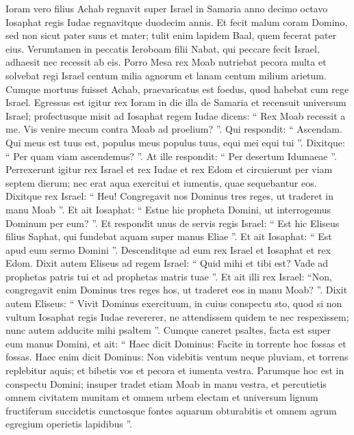 \begin{biblechapter}
\begin{biblechapter}
\begin{biblechapter}
 \verse Ioram vero filius Achab regnavit super Israel in Samaria anno decimo octavo Iosaphat regis Iudae regnavitque duodecim annis. 
\verse Et fecit malum coram Domino, sed non sicut pater suus et mater; tulit enim lapidem Baal, quem fecerat pater eius. 
\verse Verumtamen in peccatis Ieroboam filii Nabat, qui peccare fecit Israel, adhaesit nec recessit ab eis.
 \verse Porro Mesa rex Moab nutriebat pecora multa et solvebat regi Israel centum milia agnorum et lanam centum milium arietum. 
\verse Cumque mortuus fuisset Achab, praevaricatus est foedus, quod habebat cum rege Israel. 
\verse Egressus est igitur rex Ioram in die illa de Samaria et recensuit universum Israel; 
\verse profectusque misit ad Iosaphat regem Iudae dicens: “ Rex Moab recessit a me. Vis venire mecum contra Moab ad proelium? ”. Qui respondit: “ Ascendam. Qui meus est tuus est, populus meus populus tuus, equi mei equi tui ”. 
\verse Dixitque: “ Per quam viam ascendemus? ”. At ille respondit: “ Per desertum Idumaeae ”.
 \verse Perrexerunt igitur rex Israel et rex Iudae et rex Edom et circuierunt per viam septem dierum; nec erat aqua exercitui et iumentis, quae sequebantur eos. 
\verse Dixitque rex Israel: “ Heu! Congregavit nos Dominus tres reges, ut traderet in manu Moab ”. 
\verse Et ait Iosaphat: “ Estne hic propheta Domini, ut interrogemus Dominum per eum? ”. Et respondit unus de servis regis Israel: “ Est hic Eliseus filius Saphat, qui fundebat aquam super manus Eliae ”. 
\verse Et ait Iosaphat: “ Est apud eum sermo Domini ”. Descenditque ad eum rex Israel et Iosaphat et rex Edom. 
\verse Dixit autem Eliseus ad regem Israel: “ Quid mihi et tibi est? Vade ad prophetas patris tui et ad prophetas matris tuae ”. Et ait illi rex Israel: “Non, congregavit enim Dominus tres reges hos, ut traderet eos in manu Moab? ”.
 \verse Dixit autem Eliseus: “ Vivit Dominus exercituum, in cuius conspectu sto, quod si non vultum Iosaphat regis Iudae revererer, ne attendissem quidem te nec respexissem; 
\verse nunc autem adducite mihi psaltem ”. Cumque caneret psaltes, facta est super eum manus Domini, 
\verse et ait: “ Haec dicit Dominus: Facite in torrente hoc fossas et fossas. 
\verse Haec enim dicit Dominus: Non videbitis ventum neque pluviam, et torrens replebitur aquis; et bibetis vos et pecora et iumenta vestra. 
\verse Parumque hoc est in conspectu Domini; insuper tradet etiam Moab in manu vestra, 
\verse et percutietis omnem civitatem munitam et omnem urbem electam et universum lignum fructiferum succidetis cunctosque fontes aquarum obturabitis et omnem agrum egregium operietis lapidibus ”. 

\end{biblechapter}
\end{biblechapter}
\end{biblechapter}
